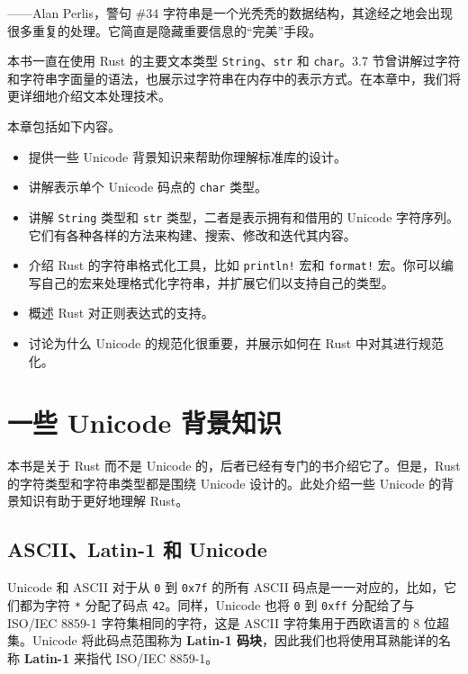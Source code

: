 
\begin{myEpigraph}{——Alan Perlis，警句 \#34}
字符串是一个光秃秃的数据结构，其途经之地会出现很多重复的处理。它简直是隐藏重要信息的“完美”手段。
\end{myEpigraph}

本书一直在使用 Rust 的主要文本类型 \texttt{String}、\texttt{str} 和 \texttt{char}。3.7 节曾讲解过字符和字符串字面量的语法，也展示过字符串在内存中的表示方式。在本章中，我们将更详细地介绍文本处理技术。

本章包括如下内容。

\begin{itemize}
\item 提供一些 Unicode 背景知识来帮助你理解标准库的设计。
\item 讲解表示单个 Unicode 码点的 \texttt{char} 类型。
\item 讲解 \texttt{String} 类型和 \texttt{str} 类型，二者是表示拥有和借用的 Unicode 字符序列。它们有各种各样的方法来构建、搜索、修改和迭代其内容。
\item 介绍 Rust 的字符串格式化工具，比如 \texttt{println!} 宏和 \texttt{format!} 宏。你可以编写自己的宏来处理格式化字符串，并扩展它们以支持自己的类型。
\item 概述 Rust 对正则表达式的支持。
\item 讨论为什么 Unicode 的规范化很重要，并展示如何在 Rust 中对其进行规范化。
\end{itemize}

\section{一些 Unicode 背景知识}

本书是关于 Rust 而不是 Unicode 的，后者已经有专门的书介绍它了。但是，Rust 的字符类型和字符串类型都是围绕 Unicode 设计的。此处介绍一些 Unicode 的背景知识有助于更好地理解 Rust。

\subsection{ASCII、Latin-1 和 Unicode}

Unicode 和 ASCII 对于从 \texttt{0} 到 \texttt{0x7f} 的所有 ASCII 码点是一一对应的，比如，它们都为字符 \texttt{*} 分配了码点 \texttt{42}。同样，Unicode 也将 \texttt{0} 到 \texttt{0xff} 分配给了与 ISO/IEC 8859-1 字符集相同的字符，这是 ASCII 字符集用于西欧语言的 8 位超集。Unicode 将此码点范围称为 \textbf{Latin-1 码块}，因此我们也将使用耳熟能详的名称 \textbf{Latin-1} 来指代 ISO/IEC 8859-1。


